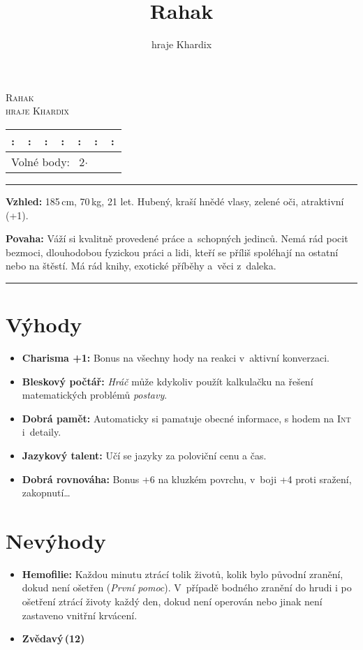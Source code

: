\documentclass[11pt,a4paper]{article}
\title{\sc Rahak}
\author{\sc hraje Khardix}
\date{}
\newcommand{\longStats}[1][]{%
  \newcommand{\shortAttr}[1]{\attrLabel{##1}:\,\attrValue{##1}}
  \begin{center}
  \begin{tabular}{|c||c|c||c||c|c||c|}\hline
    \shortAttr{Thrust} &
    \shortAttr{Speed} &
    \shortAttr{Senses} &
    \shortAttr{Dodge} &
    \shortAttr{Will} &
    \shortAttr{Lift} &
    \shortAttr{Swing} \\ \hline

    \multicolumn{7}{|l|}{Volné body:~{\color{gray} #1}} \\ \hline
  \end{tabular}
  \end{center}
}
\begin{document}
  \begin{twosidecolumns}
    \vspace{-2em}
    \begin{center}
      \textsc{\Huge Rahak}\\
      \textsc{hraje Khardix}
    \end{center}
%

    \vspace{-2em}\noindent\longStats[2$\cdot$]

    \hrule\medskip

    \noindent
    \textbf{Vzhled:} 185\,cm, 70\,kg, 21 let. Hubený, kraší hnědé vlasy, zelené
    oči, atraktivní (+1).

    \noindent
    \textbf{Povaha:}  Váží si kvalitně provedené práce a~schopných jedinců. Nemá
    rád pocit bezmoci, dlouhodobou fyzickou práci a lidi, kteří se příliš
    spoléhají na ostatní nebo na štěstí. Má rád knihy, exotické příběhy a~věci
    z~daleka.

    \medskip\hrule

    \begin{multicols}{2}
      \section*{Výhody}
      \begin{itemize}
        \item \textbf{Charisma +1:} Bonus na všechny hody na reakci v~aktivní
          konverzaci.
        \item \textbf{Bleskový počtář:} \emph{Hráč} může kdykoliv použít
          kalkulačku na řešení matematických problémů \emph{postavy}.
        \item \textbf{Dobrá pamět:} Automaticky si pamatuje obecné informace, s
          hodem na \textsc{Int} i~detaily.
        \item \textbf{Jazykový talent:} Učí se jazyky za poloviční cenu a čas.
        \item \textbf{Dobrá rovnováha:} Bonus +6 na kluzkém povrchu, v~boji +4
          proti sražení, zakopnutí\ldots
      \end{itemize}
      
      \section*{Nevýhody}
      \begin{itemize}
        \item \textbf{Hemofilie:} Každou minutu ztrácí tolik životů, kolik bylo
          původní zranění, dokud není ošetřen (\emph{První pomoc}). V~případě
          bodného zranění do hrudi i po ošetření ztrácí životy každý den, dokud
          není operován nebo jinak není zastaveno vnitřní krvácení.
        \item \textbf{Zvědavý\,(12)}
      \end{itemize}


\end{multicols}
\end{twosidecolumns}
\end{document}
